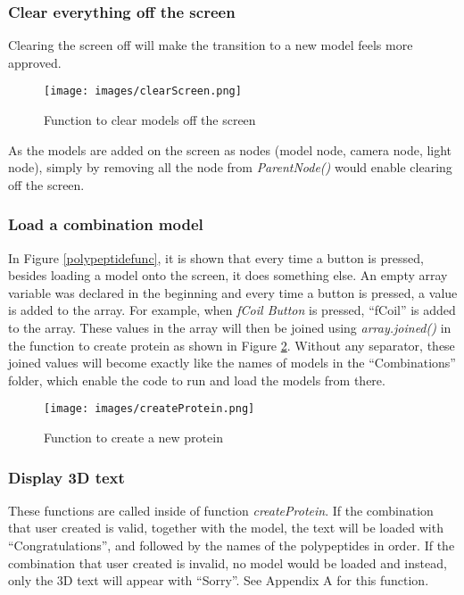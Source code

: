 \subsubsection{Clear everything off the screen}
Clearing the screen off will make the transition to a new model feels more approved. 
\begin{figure}[!htp]
	\centering
	\texttt{[image: images/clearScreen.png]}
	\caption{Function to clear models off the screen}
	\label{fig:clearScreen}
\end{figure}

As the models are added on the screen as nodes (model node, camera node, light node), simply by removing all the node from \emph{ParentNode()} would enable clearing off the screen.

\subsubsection{Load a combination model}
In Figure \ref{polypeptidefunc}, it is shown that every time a button is pressed, besides loading a model onto the screen, it does something else. An empty array variable was declared in the beginning and every time a button is pressed, a value is added to the array. For example, when \emph{fCoil Button} is pressed, “fCoil” is added to the array. These values in the array will then be joined using \emph{array.joined()} in the function to create protein as shown in Figure \ref{fig:createProtein}. Without any separator, these joined values will become exactly like the names of models in the “Combinations” folder, which enable the code to run and load the models from there. 
\begin{figure}[!htp]
	\centering
	\texttt{[image: images/createProtein.png]}
	\caption{Function to create a new protein}
	\label{fig:createProtein}
\end{figure}

\subsubsection{Display 3D text}
These functions are called inside of function \emph{createProtein}. If the combination that user created is valid, together with the model, the text will be loaded with “Congratulations”, and followed by the names of the polypeptides in order. If the combination that user created is invalid, no model would be loaded and instead, only the 3D text will appear with “Sorry”. See Appendix A for this function. 


